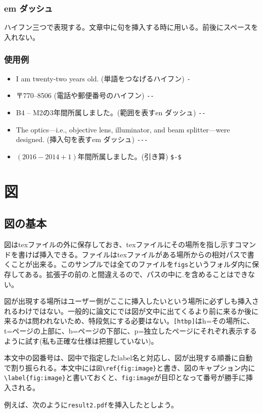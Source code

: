 \documentclass[a4j]{jsarticle}
\begin{document}
\subsubsection{em ダッシュ}
ハイフン三つで表現する。文章中に句を挿入する時に用いる。前後にスペースを入れない。

\subsubsection{使用例}
\begin{itemize}
 \item I am twenty-two years old. (単語をつなげるハイフン) \verb|-|
 \item 〒770--8506 (電話や郵便番号のハイフン)  \verb|--|
 \item B4 -- M2の3年間所属しました。(範囲を表すen ダッシュ) \verb|--|
 \item The optics---i.e., objective lens, illuminator, and beam splitter---were designed. (挿入句を表すem ダッシュ) \verb|---|
 \item $(2016-2014+1)$年間所属しました。(引き算) \verb|$-$|
\end{itemize}
\clearpage
\section{図\label{sec:figure}}
\subsection{図の基本}
図はtexファイルの外に保存しておき、texファイルにその場所を指し示すコマンドを書けば挿入できる。ファイルはtexファイルがある場所からの相対パスで書くことが出来る。このサンプルでは全てのファイルを\verb|figs|というフォルダ内に保存してある。拡張子の前の.と間違えるので、パスの中に.を含めることはできない。

図が出現する場所はユーザー側がここに挿入したいという場所に必ずしも挿入されるわけではない。一般的に論文にでは図が文中に出てくるより前に来るか後に来るかは問われないため、特段気にする必要はない。\verb|[htbp]|はh=その場所に、t=ページの上部に、b=ページの下部に、p=独立したページにそれぞれ表示するように試す(私も正確な仕様は把握していない)。

本文中の図番号は、図中で指定したlabel名と対応し、図が出現する順番に自動で割り振られる。本文中には\verb|図\ref{fig:image}|と書き、図のキャプション内に\verb|\label{fig:image}|と書いておくと、\verb|fig:image|が目印となって番号が勝手に挿入される。

例えば、次のように\verb|result2.pdf|を挿入したとしよう。
\end{document}
